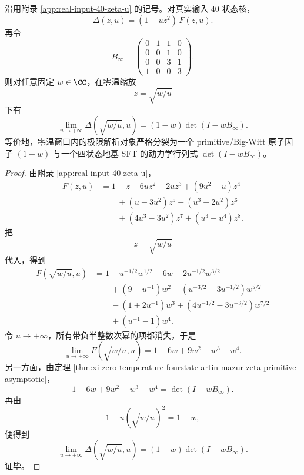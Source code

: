 \begin{theorem}\label{thm:xi-zero-temp-atomic-ground-exact-splitting}
沿用附录 \ref{app:real-input-40-zeta-u} 的记号。对真实输入 \(40\) 状态核，
\[
\Delta(z,u)=(1-uz^2)\,F(z,u).
\]
再令
\[
B_\infty=
\begin{pmatrix}
0&1&1&0\\
0&0&1&0\\
0&0&3&1\\
1&0&0&3
\end{pmatrix}.
\]
则对任意固定 \(w\in\CC\)，在零温缩放
\[
z=\sqrt{w/u}
\]
下有
\[
\boxed{\;
\lim_{u\to+\infty}\Delta\!\left(\sqrt{w/u},u\right)
=
(1-w)\det(I-wB_\infty).\;}
\]
等价地，零温窗口内的极限解析对象严格分裂为一个 primitive/Big-Witt 原子因子 \((1-w)\) 与一个四状态地基 SFT 的动力学行列式 \(\det(I-wB_\infty)\)。
\end{theorem}
\begin{proof}
由附录 \ref{app:real-input-40-zeta-u}，
\[
\begin{aligned}
F(z,u)
&=
1-z-6uz^2+2uz^3+(9u^2-u)z^4\\
&\qquad +(u-3u^2)z^5-(u^3+2u^2)z^6\\
&\qquad +(4u^3-3u^2)z^7+(u^3-u^4)z^8.
\end{aligned}
\]
把
\[
z=\sqrt{w/u}
\]
代入，得到
\[
\begin{aligned}
F\!\left(\sqrt{w/u},u\right)
&=
1-u^{-1/2}w^{1/2}-6w+2u^{-1/2}w^{3/2}\\
&\qquad +(9-u^{-1})w^2+(u^{-3/2}-3u^{-1/2})w^{5/2}\\
&\qquad -(1+2u^{-1})w^3+(4u^{-1/2}-3u^{-3/2})w^{7/2}\\
&\qquad +(u^{-1}-1)w^4.
\end{aligned}
\]
令 \(u\to+\infty\)，所有带负半整数次幂的项都消失，于是
\[
\lim_{u\to+\infty}F\!\left(\sqrt{w/u},u\right)
=
1-6w+9w^2-w^3-w^4.
\]
另一方面，由定理 \ref{thm:xi-zero-temperature-fourstate-artin-mazur-zeta-primitive-asymptotic}，
\[
1-6w+9w^2-w^3-w^4=\det(I-wB_\infty).
\]
再由
\[
1-u\left(\sqrt{w/u}\right)^2=1-w,
\]
便得到
\[
\lim_{u\to+\infty}\Delta\!\left(\sqrt{w/u},u\right)
=
(1-w)\det(I-wB_\infty).
\]
证毕。
\end{proof}

